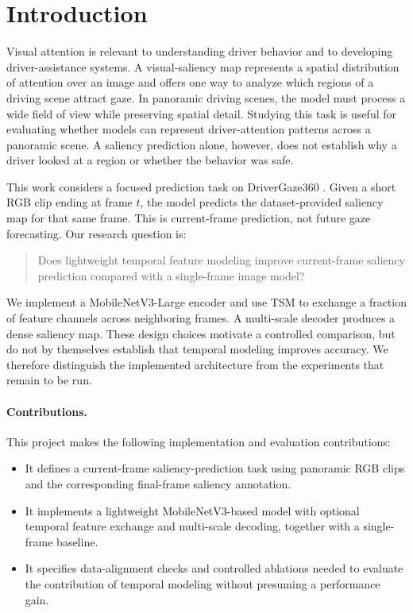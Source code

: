\documentclass[10pt,twocolumn,letterpaper]{article}
\begin{document}
\section{Introduction}
\label{sec:intro}

Visual attention is relevant to understanding driver behavior and to
developing driver-assistance systems. A visual-saliency map represents a
spatial distribution of attention over an image and offers one way to analyze
which regions of a driving scene attract gaze. In panoramic driving scenes,
the model must process a wide field of view while preserving spatial detail.
Studying this task is useful for evaluating whether models can represent
driver-attention patterns across a panoramic scene. A saliency prediction
alone, however, does not establish why a driver looked at a region or whether
the behavior was safe.

This work considers a focused prediction task on DriverGaze360
\cite{govil2026drivergaze360}. Given a short RGB clip ending at frame \(t\),
the model predicts the dataset-provided saliency map for that same frame.
This is current-frame prediction, not future gaze forecasting. Our research
question is:
\begin{quote}
Does lightweight temporal feature modeling improve current-frame saliency
prediction compared with a single-frame image model?
\end{quote}

We implement a MobileNetV3-Large encoder \cite{howard2019mobilenetv3} and use
TSM \cite{lin2019tsm} to exchange a fraction of feature channels across
neighboring frames. A multi-scale decoder produces a dense saliency map.
These design choices motivate a controlled comparison, but do not by
themselves establish that temporal modeling improves accuracy. We therefore
distinguish the implemented architecture from the experiments that remain to
be run.

\paragraph{Contributions.}
This project makes the following implementation and evaluation contributions:
\begin{itemize}
    \item It defines a current-frame saliency-prediction task using panoramic
    RGB clips and the corresponding final-frame saliency annotation.
    \item It implements a lightweight MobileNetV3-based model with optional
    temporal feature exchange and multi-scale decoding, together with a
    single-frame baseline.
    \item It specifies data-alignment checks and controlled ablations needed
    to evaluate the contribution of temporal modeling without presuming a
    performance gain.
\end{itemize}
\end{document}
